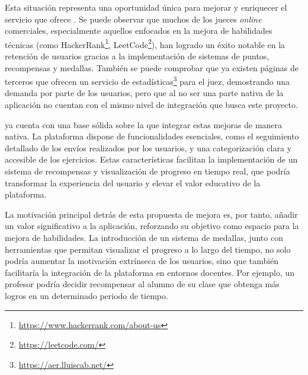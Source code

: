 Esta situación representa una oportunidad única para mejorar y enriquecer el servicio que ofrece \aer. Se puede observar que muchos de los jueces \textit{online} comerciales, especialmente aquellos enfocados en la mejora de habilidades técnicas (como HackerRank\footnote{\url{https://www.hackerrank.com/about-us}}, LeetCode\footnote{\url{https://leetcode.com/}}), han logrado un éxito notable en la retención de usuarios gracias a la implementación de sistemas de puntos, recompensas y medallas. También se puede comprobar que ya existen páginas de terceros que ofrecen un servicio de estadísticas\footnote{\url{https://aer.lluiscab.net/}} para el juez, demostrando una demanda por parte de los usuarios, pero que al no ser una parte nativa de la aplicación no cuentan con el mismo nivel de integración que busca este proyecto.

\aer ya cuenta con una base sólida sobre la que integrar estas mejoras de manera nativa. La plataforma dispone de funcionalidades esenciales, como el seguimiento detallado de los envíos realizados por los usuarios, y una categorización clara y accesible de los ejercicios. Estas características facilitan la implementación de un sistema de recompensas y visualización de progreso en tiempo real, que podría transformar la experiencia del usuario y elevar el valor educativo de la plataforma.

La motivación principal detrás de esta propuesta de mejora es, por tanto, añadir un valor significativo a la aplicación, reforzando su objetivo como espacio para la mejora de habilidades. La introducción de un sistema de medallas, junto con herramientas que permitan visualizar el progreso a lo largo del tiempo, no solo podría aumentar la motivación extrínseca de los usuarios, sino que también facilitaría la integración de la plataforma en entornos docentes. Por ejemplo, un profesor podría decidir recompensar al alumno de su clase que obtenga más logros en un determinado periodo de tiempo.

